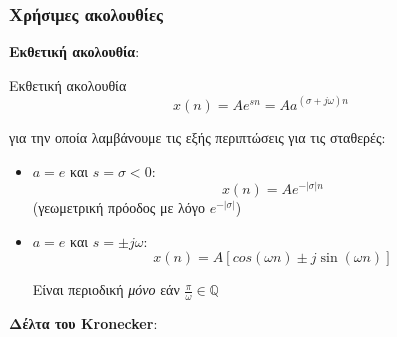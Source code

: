 \documentclass[11pt,a4paper,notitlepage,fleqn]{article}
\begin{document}
\pagebreak[3]

\subsubsection{Χρήσιμες ακολουθίες}
\begin{enumpar}
	\item \textbf{Εκθετική ακολουθία}:

	\begin{minipage}{.5\textwidth}
		\begin{knowledgebox}{Εκθετική ακολουθία}
		\[ \displaystyle
		x(n) = Ae^{sn} = Aa^{(\sigma + j \omega )n}
		\]
		\end{knowledgebox}

		για την οποία λαμβάνουμε τις εξής περιπτώσεις για τις σταθερές:
		\begin{itemize}
			\item \( a=e \) και \( s = \sigma < 0 \):
			\[
			x(n) = Ae^{-|σ|n}
			\]
			(γεωμετρική πρόοδος με λόγο \( e^{-|σ|} \))
			\item \( a=e \) και \( s = \pm j\omega  \):
			\[
			x(n) = A\left[
			cos(\omega n) \pm j \sin(\omega n)
			\right]
			\]
			
			Είναι περιοδική \textit{μόνο} εάν \( \frac{\pi}{\omega } \in \mathbb Q \)
		\end{itemize}
	\end{minipage}
	\begin{minipage}{.5\textwidth}
		\begin{center}
		\end{center}
	\end{minipage}
    \item \textbf{Δέλτα του Kronecker}:


\end{enumpar}
\end{document}
